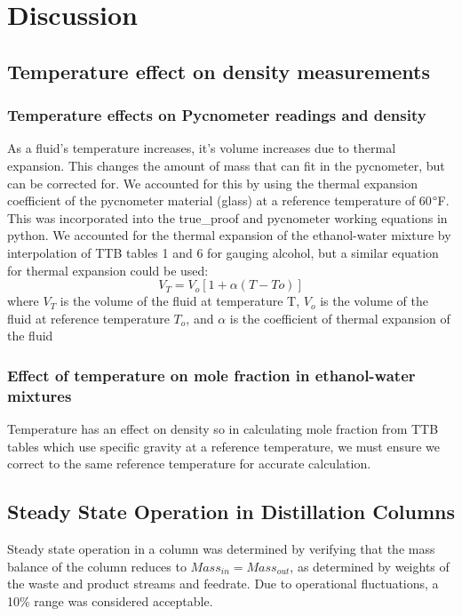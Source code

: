 \documentclass[lettersize,journal]{IEEEtran}
\begin{document}
		
	
	
	
	
	
	
	\section{Discussion}
\subsection{Temperature effect on density measurements}
\subsubsection{Temperature effects on Pycnometer readings and density}
As a fluid's temperature increases, it's volume increases due to thermal expansion. This changes the amount of mass that can fit in the pycnometer, but can be corrected for. We accounted for this by using the thermal expansion coefficient of the pycnometer material (glass) at a reference temperature of 60$\degree$F. This was incorporated into the true\_proof and pycnometer working equations in python. We accounted for the thermal expansion of the ethanol-water mixture by interpolation of TTB tables 1 and 6 for gauging alcohol, but a similar equation for thermal expansion could be used:
\begin{equation}
	\label{deqn_ex5.5}
	V_{T} = V_{o}[1+\alpha(T-T{o})]
\end{equation}
where $V_{T}$ is the volume of the fluid at temperature T, $V_{o}$ is the volume of the fluid at reference temperature $T_{o}$, and $\alpha$ is the coefficient of thermal expansion of the fluid
\subsubsection{Effect of temperature on mole fraction in ethanol-water mixtures}
Temperature has an effect on density so in calculating mole fraction from TTB tables which use specific gravity at a reference temperature, we must ensure we correct to the same reference temperature for accurate calculation. 
\subsection{Steady State Operation in Distillation Columns}
Steady state operation in a column was determined by verifying that the mass balance of the column reduces to $Mass_{in} = Mass_{out}$, as determined by weights of the waste and product streams and feedrate. Due to operational fluctuations, a 10\% range was considered acceptable.
\end{document}
